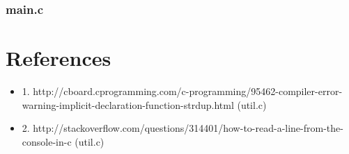 \documentclass[a4paper, twoside]{article}
\begin{document}
\subsubsection{main.c}


\section{References}
\begin{itemize}
\item{1. http://cboard.cprogramming.com/c-programming/95462-compiler-error-warning-implicit-declaration-function-strdup.html (util.c)}
\item{2. http://stackoverflow.com/questions/314401/how-to-read-a-line-from-the-console-in-c (util.c)}
\end{itemize}
\end{document}
